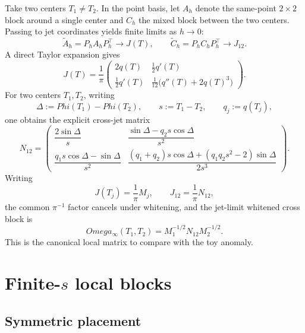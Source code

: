 \documentclass[11pt,a4paper]{amsart}
\def\Omega{Omega}%
\def\Phi{Phi}%
\theoremstyle{plain}
\theoremstyle{definition}
\newcommand{\Ph}{\Phi}
\begin{document}
Take two centers $T_1\neq T_2$. In the point basis, let $A_h$ denote the same-point $2\times 2$ block around a single center and $C_h$ the mixed block between the two centers. Passing to jet coordinates yields finite limits as $h\to 0$:
\[
\widetilde A_h=P_hA_hP_h^\top \to J(T),
\qquad
\widetilde C_h=P_hC_hP_h^\top \to J_{12}.
\]
A direct Taylor expansion gives
\begin{equation}\label{eq:J-T}
J(T)=\frac1\pi
\begin{pmatrix}
2q(T) & \frac12 q'(T)\\[1ex]
\frac12 q'(T) & \frac1{12}\bigl(q''(T)+2q(T)^3\bigr)
\end{pmatrix}.
\end{equation}
For two centers $T_1,T_2$, writing
\[
\Delta:=\Ph(T_1)-\Ph(T_2),
\qquad s:=T_1-T_2,
\qquad q_j:=q(T_j),
\]
one obtains the explicit cross-jet matrix
\begin{equation}\label{eq:N12}
N_{12}=
\begin{pmatrix}
\dfrac{2\sin \Delta}{s}
&
\dfrac{\sin \Delta-q_2 s\cos \Delta}{s^2}
\\[2ex]
\dfrac{q_1 s\cos \Delta-\sin \Delta}{s^2}
&
\dfrac{(q_1+q_2)s\cos \Delta+(q_1q_2s^2-2)\sin \Delta}{2s^3}
\end{pmatrix}.
\end{equation}
Writing
\[
J(T_j)=\frac1\pi M_j,
\qquad
J_{12}=\frac1\pi N_{12},
\]
the common $\pi^{-1}$ factor cancels under whitening, and the jet-limit whitened cross block is
\begin{equation}\label{eq:omega-infty}
\Omega_\infty(T_1,T_2)=M_1^{-1/2}N_{12}M_2^{-1/2}.
\end{equation}
This is the canonical local matrix to compare with the toy anomaly.

\section{Finite-\texorpdfstring{$s$}{s} local blocks}

\subsection{Symmetric placement}
\end{document}
